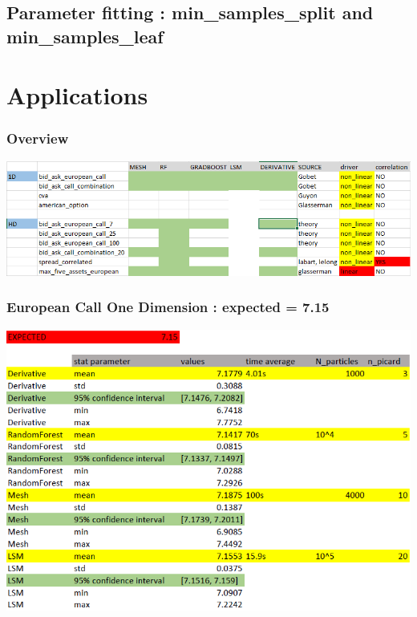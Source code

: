 \documentclass[10pt]{beamer}
\begin{document}
\subsection{Parameter fitting : min\_samples\_split and min\_samples\_leaf}

\begin{frame}
	
\end{frame}


\section{Applications}


\begin{frame}
	\frametitle{Overview}
	
	\centering
	\includegraphics[scale=0.5]{overview.png}
	
\end{frame}

 \begin{frame}
 \frametitle{European Call One Dimension : expected = 7.15}
	
	\centering
	\includegraphics[scale=0.4]{bid_ask_call_1d.png}

 \end{frame}
 
\end{document}
